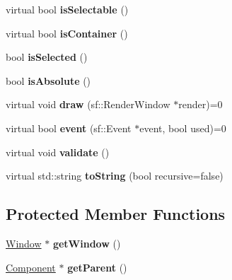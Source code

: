 \begin{DoxyCompactItemize}
\item 
\hypertarget{classgraphics_1_1_component_aebbf2506400c91e1e95781101ed866e0}{virtual bool {\bfseries is\-Selectable} ()}\label{classgraphics_1_1_component_aebbf2506400c91e1e95781101ed866e0}

\item 
\hypertarget{classgraphics_1_1_component_a745e462a47e01ae61fa1374ece871148}{virtual bool {\bfseries is\-Container} ()}\label{classgraphics_1_1_component_a745e462a47e01ae61fa1374ece871148}

\item 
\hypertarget{classgraphics_1_1_component_a4a7ed246d5f4ba6bfdcc4658e08bf4aa}{bool {\bfseries is\-Selected} ()}\label{classgraphics_1_1_component_a4a7ed246d5f4ba6bfdcc4658e08bf4aa}

\item 
\hypertarget{classgraphics_1_1_component_adaa46cecb3b97183ec5efaa2c41e84cd}{bool {\bfseries is\-Absolute} ()}\label{classgraphics_1_1_component_adaa46cecb3b97183ec5efaa2c41e84cd}

\item 
\hypertarget{classgraphics_1_1_component_a8a57fbe2a11eb628a4a011db94869976}{virtual void {\bfseries draw} (sf\-::\-Render\-Window $\ast$render)=0}\label{classgraphics_1_1_component_a8a57fbe2a11eb628a4a011db94869976}

\item 
\hypertarget{classgraphics_1_1_component_ad4c77f126eae5a4a4a929043318123dc}{virtual bool {\bfseries event} (sf\-::\-Event $\ast$event, bool used)=0}\label{classgraphics_1_1_component_ad4c77f126eae5a4a4a929043318123dc}

\item 
\hypertarget{classgraphics_1_1_component_aa53e232905495cc2945c239a434482a8}{virtual void {\bfseries validate} ()}\label{classgraphics_1_1_component_aa53e232905495cc2945c239a434482a8}

\item 
\hypertarget{classgraphics_1_1_component_aae5fabfec44cfe4e1c71b41d85d8fb05}{virtual std\-::string {\bfseries to\-String} (bool recursive=false)}\label{classgraphics_1_1_component_aae5fabfec44cfe4e1c71b41d85d8fb05}

\end{DoxyCompactItemize}
\subsection*{Protected Member Functions}
\begin{DoxyCompactItemize}
\item 
\hypertarget{classgraphics_1_1_component_a6b9a8d21a9493e5ad64cdd678360fedc}{\hyperlink{classgraphics_1_1_window}{Window} $\ast$ {\bfseries get\-Window} ()}\label{classgraphics_1_1_component_a6b9a8d21a9493e5ad64cdd678360fedc}

\item 
\hypertarget{classgraphics_1_1_component_aff7a89f0d7e489b16be4a2626849c713}{\hyperlink{classgraphics_1_1_component}{Component} $\ast$ {\bfseries get\-Parent} ()}\label{classgraphics_1_1_component_aff7a89f0d7e489b16be4a2626849c713}

\end{DoxyCompactItemize}
